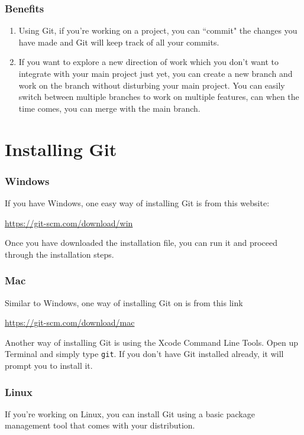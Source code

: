\documentclass[12pt]{report}
\renewcommand\section[1]{{\chapter{#1}}}
\begin{document}
\subsection{Benefits}
\begin{enumerate}
  \item Using Git, if you're working on a project, you can ``commit" the changes you have made and Git will keep track of all your commits. 
  
  \item If you want to explore a new direction of work which you don't want to integrate with your main project just yet, you can create a new branch and work on the branch without disturbing your main project. You can easily switch between multiple branches to work on multiple features, can when the time comes, you can merge with the main branch. 
\end{enumerate}

\section{Installing Git}

\subsection{Windows}
If you have Windows, one easy way of installing Git is from this website:

\url{https://git-scm.com/download/win}

\noindent
Once you have downloaded the installation file, you can run it and proceed through the installation steps.

\subsection{Mac}

Similar to Windows, one way of installing Git on is from this link

\url{https://git-scm.com/download/mac}


\noindent
Another way of installing Git is using the Xcode Command Line Tools. Open up Terminal 
and simply type \verb|git|. If you don’t have Git installed already, it will prompt you to install it.

\subsection{Linux}

If you're working on Linux, you can install Git using a basic package management tool that comes with your distribution.
\end{document}
